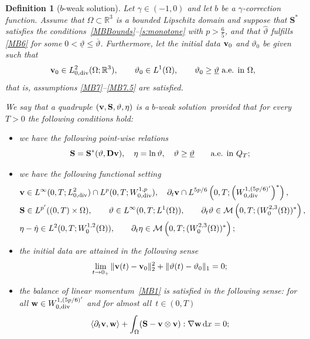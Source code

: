 \documentclass[11pt, a4paper, reqno]{amsart}
\newtheorem{definition}[theorem]{Definition}
\numberwithin{equation}{section}
\newcommand{\diver}{\operatorname{div}}
\newcommand{\vc}[1]{{\bf #1}}
\newcommand{\vv}{\vc{v}}
\newcommand{\vw}{\vc{w}}
\newcommand{\thet}{\vartheta}
\renewcommand{\S}{\mathbf{S}}
\newcommand{\D}{\mathbf{D}}
\newcommand{\dx}{\,{\rm d} {x}}
\newcommand{\intO}[1]{\int_{\Omega} #1 \dx}
\newcommand{\tmin}{\underline{\thet}}
\newcommand{\tmax}{\overline{\thet}}
\newcommand{\bb}{b}
\newcommand{\blafnc}{correction function}
\newcommand{\bws}{$\bb$-weak solution}
\begin{document}
\begin{definition}[\bws]\label{proper-sol}
Let $\gamma \in (-1,0)$ and let $\bb$ be a $\gamma$-\blafnc. Assume that $\Omega \subset \mathbb{R}^3$ 
is a bounded Lipschitz domain and suppose that $\S^*$ satisfies the conditions~\eqref{MBBounds}--\eqref{s:monotone} with $p>\frac65$,  
and that $\hat{\thet}$ fulfills \eqref{MB6} for some $0 < \tmin \leq \tmax$. Furthermore, let the initial data 
$\vv_0$ and $\thet_0$ be given such that 
\[
  \vv_0 \in L^2_{0,\diver}(\Omega;\mathbb{R}^3), \qquad 
  \thet_0 \in L^1(\Omega), \qquad 
  \thet_0 \geq \tmin \ \text{a.e. in } \Omega,
\]
that is, assumptions \eqref{MB7}--\eqref{MB7.5} are satisfied.  

We say that a quadruple $(\vv,\S,\thet,\eta)$ is a \bws\ provided that for every $T > 0$ the following conditions hold:
\begin{itemize}[leftmargin=*]
\item we have the following point-wise relations
$$
\S=\S^*(\thet,\D\vv), \quad \eta=\ln \thet, \quad \thet\ge \tmin \qquad \textrm{a.e. in } Q_T;
$$
\item we have the following functional setting
\begin{align}\label{MBap}
\begin{aligned}
&\vv \in L^\infty(0,T; L^2_{0,\diver}) \cap L^p(0,T; W^{1,p}_{0,\diver}),\quad \partial_t\vv \cap L^{5p/6}\left(0,T; \left(W^{1,(5p/6)'}_{0,\diver}\right)^*\right),\\
&\S \in L^{p'}((0,T)\times \Omega),\qquad \thet \in L^\infty(0,T; L^1(\Omega)), \qquad \partial_t \thet \in \mathcal{M}\left(0,T; (W^{2,3}_0(\Omega))^*\right),\\
&\eta-\hat{\eta} \in L^2(0,T; W^{1,2}_0(\Omega)), \qquad \partial_t \eta \in \mathcal{M}\left(0,T; (W^{2,3}_0(\Omega))^*\right);
\end{aligned}
\end{align}
\item the initial data are attained in the following sense
\begin{equation}\label{eq:att-ic}
\lim_{t\to 0_+} \|\vv(t)-\vv_0\|_2^2+ \|\thet(t)-\thet_0\|_1  = 0;
\end{equation}
\item the balance of linear momentum~\eqref{MB1} is satisfied in the following sense: for all $\vw\in W^{1,(5p/6)'}_{0,\diver}$ and for almost all~$t\in (0,T)$ 
\begin{equation}\label{weak1}
\langle \partial_t\vv, \vw \rangle + \intO{(\S- \vv \otimes \vv): \nabla \vw}=0; %

\end{equation}
\end{itemize}
\end{definition}
\end{document}
